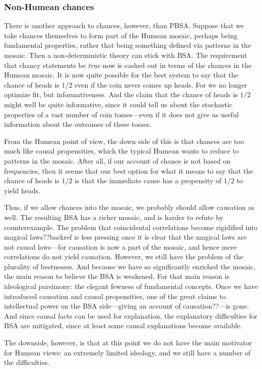 \subsubsection{Non-Humean chances}
There is another approach to chances, however, than PBSA. Suppose that we take chances themselves to form part of the Humean
mosaic, perhaps being fundamental properties, rather that being something defined via patterns in the mosaic. Then a 
non-deterministic theory can stick with BSA. The requirement that chancy statements be \textit{true} now is cashed
out in terms of the chances in the Humean mosaic. It is now quite possible for the best system to say that the chance
of heads is $1/2$ even if the coin never comes up heads. For we no longer optimize fit, but informativeness. And the
claim that the chance of heads is $1/2$ might well be quite informative, since it could tell us about the stochastic 
properties of a vast number of coin tosses---even if it does not give us useful information about the outcomes of
these tosses.

From the Humean point of view, the down side of this is that chances are too much like causal propensities, which the
typical Humean wants to reduce to patterns in the mosaic. After all, if our account of chance is not based on frequencies,
then it seems that our best option for what it means to say that the chance of heads is $1/2$ is that the immediate
cause has a propensity of $1/2$ to yield heads.

Thus, if we allow chances into the mosaic, we probably should allow causation as well. The resulting BSA has a richer
mosaic, and is harder to refute by counterexample. The problem that coincidental correlations become rigidified into
magical laws??backref is less pressing once it is clear that the magical laws are not causal laws---for causation is 
now a part of the mosaic, and hence mere correlations do not yield causation. However, we still have the problem of 
the plurality of bestnesses. And because we have so significantly enriched the mosaic, the main reason to believe the
BSA is weakened. For that main reason is ideological parsimony: the elegant fewness of fundamental concepts. Once we 
have introduced causation and causal propensities, one of the great claims to intellectual power on the BSA side---giving
an account of causation??---is gone. And since causal facts can be used for explanation, the explanatory difficulties
for BSA are mitigated, since at least some causal explanations become available.

The downside, however, is that at this point we do not have the main motivator for Humean views: an extremely limited
ideology, and we still have a number of the difficulties.


